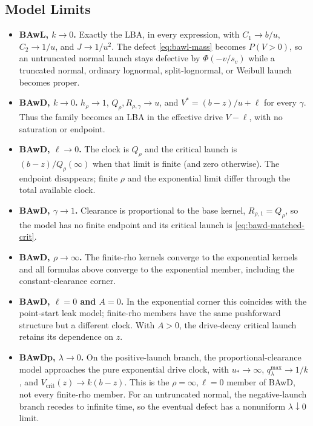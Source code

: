 \documentclass[12pt]{article}
\newcommand{\PhiN}{\Phi}
\theoremstyle{remark}
\begin{document}
\subsection{Model Limits}
\begin{itemize}
  \item \textbf{BAwL, $k \to 0$.} Exactly the LBA, in every expression, with $C_1 \to b/u$, $C_2 \to 1/u$, and $J \to 1/u^2$. The defect
        \eqref{eq:bawl-mass} becomes $P(V > 0)$, so an untruncated normal
        launch stays defective by $\PhiN(-v/s_v)$ while a truncated normal, ordinary lognormal, split-lognormal, or Weibull launch becomes proper.
  \item \textbf{BAwD, $k \to 0$.} $h_\rho\to1$, $Q_\rho,R_{\rho,\gamma}\to u$, and $V^*=(b-z)/u+\ell$ for every $\gamma$. Thus the family becomes an LBA in the effective drive $V-\ell$, with no saturation or endpoint.
  \item \textbf{BAwD, $\ell\to0$.} The clock is $Q_\rho$ and the critical launch is $(b-z)/Q_\rho(\infty)$ when that limit is finite (and zero otherwise). The endpoint disappears; finite $\rho$ and the exponential limit differ through the total available clock.
  \item \textbf{BAwD, $\gamma\to1$.} Clearance is proportional to the base kernel, $R_{\rho,1}=Q_\rho$, so the model has no finite endpoint and its critical launch is \eqref{eq:bawd-matched-crit}.
  \item \textbf{BAwD, $\rho\to\infty$.} The finite-rho kernels converge to the exponential kernels and all formulas above converge to the exponential member, including the constant-clearance corner.
  \item \textbf{BAwD, $\ell=0$ and $A=0$.} In the exponential corner this coincides with the point-start leak model; finite-rho members have the same pushforward structure but a different clock. With $A>0$, the drive-decay critical launch retains its dependence on $z$.
  \item \textbf{BAwDp, $\lambda \to 0$.} On the positive-launch branch, the proportional-clearance model approaches the pure exponential drive clock, with $u_{*}\to\infty$, $q_\lambda^{\max}\to1/k$, and $V_{\mathrm{crit}}(z)\to k(b-z)$. This is the $\rho=\infty,\ell=0$ member of BAwD, not every finite-rho member. For an untruncated normal, the negative-launch branch recedes to infinite time, so the eventual defect has a nonuniform $\lambda\downarrow0$ limit.

\end{itemize}
\end{document}

